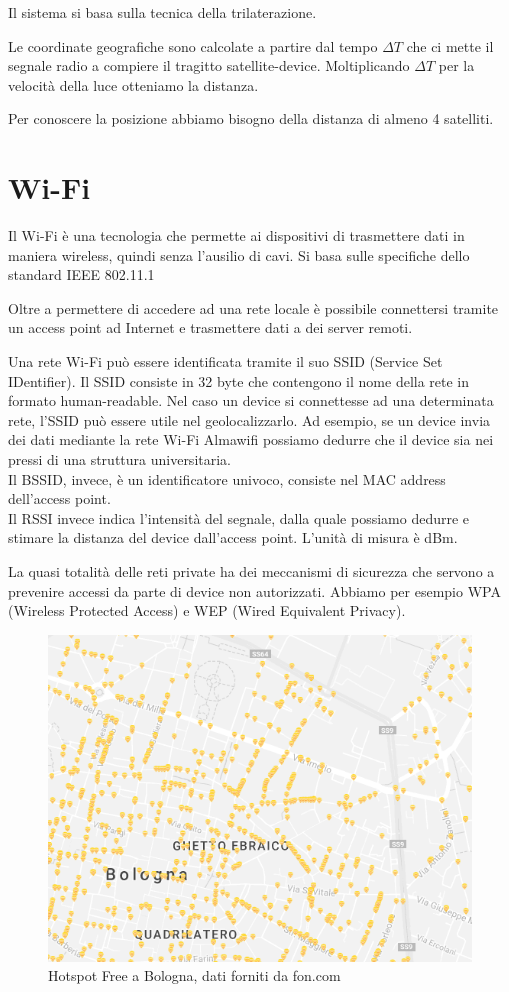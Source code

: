 \documentclass[12pt,a4paper,openright,twoside]{report}
\begin{document}
Il sistema si basa sulla tecnica della trilaterazione. 


Le coordinate geografiche sono calcolate a partire dal tempo $ \Delta T $ che ci mette il segnale radio a compiere il tragitto satellite-device. Moltiplicando $ \Delta T $ per la velocità della luce otteniamo la distanza. 

Per conoscere la posizione abbiamo bisogno della distanza di almeno 4 satelliti.

\section{Wi-Fi}
Il Wi-Fi è una tecnologia che permette ai dispositivi di trasmettere dati in maniera wireless, quindi senza l'ausilio di cavi. Si basa sulle specifiche dello standard IEEE 802.11.1

Oltre a permettere di accedere ad una rete locale è possibile connettersi tramite un access point ad Internet e trasmettere dati a dei server remoti.

Una rete Wi-Fi può essere identificata tramite il suo SSID (Service Set IDentifier). Il SSID consiste in 32 byte che contengono il nome della rete in formato human-readable. Nel caso un device si connettesse ad una determinata rete, l'SSID può essere utile nel geolocalizzarlo. 
Ad esempio, se un device invia dei dati mediante la rete Wi-Fi Almawifi possiamo dedurre che il device sia nei pressi di una struttura universitaria.\\
Il BSSID, invece, è un identificatore univoco, consiste nel MAC address dell'access point. \\
Il RSSI invece indica l'intensità del segnale, dalla quale possiamo dedurre e stimare la distanza del device dall'access point. L'unità di misura è dBm.

La quasi totalità delle reti private ha dei meccanismi di sicurezza che servono a prevenire accessi da parte di device non autorizzati. 
Abbiamo per esempio WPA (Wireless Protected Access) e WEP (Wired Equivalent Privacy).

\begin{figure}[h!]
\centering 
\includegraphics[scale=0.6]{fig7} 
\caption{Hotspot Free a Bologna, dati forniti da fon.com \cite{K17}} 
\end{figure}
\end{document}

